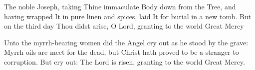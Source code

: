 \documentclass[twoside, letterpaper, 12pt]{report}
\begin{document}

The noble Joseph, taking Thine immaculate Body down from the Tree, and having wrapped It in
pure linen and spices, laid It for burial in a new tomb. But on the third day Thou didst arise, O
Lord, granting to the world Great Mercy

Unto the myrrh-bearing women did the Angel cry out as he stood by the grave: Myrrh-oils are
meet for the dead, but Christ hath proved to be a stranger to corruption. But cry out: The Lord is
risen, granting to the world Great Mercy.


\readerline{\throughtheprayers}

\end{document}
